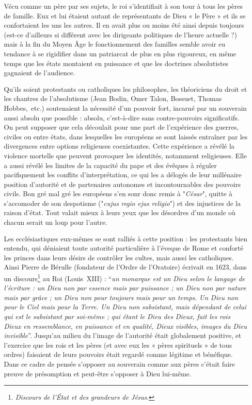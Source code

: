 Vécu comme un père par ses sujets, le roi s'identifiait à son tour à tous les pères de famille. Eux et lui étaient autant de représentants de Dieu « le Père » et ils se confortaient les uns les autres. Il en avait plus ou moins été ainsi depuis toujours (est-ce d'ailleurs si différent avec les dirigeants politiques de l'heure actuelle ?) mais à la fin du Moyen Âge le fonctionnement des familles semble avoir eu tendance à se rigidifier dans un patriarcat de plus en plus rigoureux, en même temps que les états montaient en puissance et que les doctrines absolutistes gagnaient de l'audience. 

Qu'ils soient protestants ou catholiques les philosophes, les théoriciens du droit et les chantres de l'absolutisme (Jean Bodin, Omer Talon, Bossuet, Thomas Hobbes,~etc.) soutenaient la nécessité d'un pouvoir fort, incarné par un souverain aussi absolu que possible : absolu, c'est-à-dire sans contre-pouvoirs significatifs. On peut supposer que cela découlait pour une part de l'expérience des guerres, civiles ou entre états, dans lesquelles les européens se sont laissés entraîner par les divergences entre options religieuses coexistantes. Cette expérience a révélé la violence mortelle que peuvent provoquer les identités, notamment religieuses. Elle a aussi révélé les limites de la capacité du pape et des évêques à réguler pacifiquement les conflits d'interprétation, ce qui les a délogés de leur millénaire position d'autorité et de partenaires autonomes et incontournables des pouvoirs civils. Bon gré mal gré les européens s'en sonr donc remis à "\emph{César}", quitte à s'accomoder de son despotisme ("\emph{cujus regio ejus religio}") et des injustices de la raison d'état. Tout valait mieux à leurs yeux que les désordres d'un monde où chacun serait un loup pour l'autre. 

Les ecclésiastiques eux-mêmes se sont ralliés à cette position : les protestants bien entendu, qui déniaient toute autorité particulière à l'éveque de Rome et conforté les princes dans leurs désirs de contrôler les cultes, mais aussi les catholiques. Ainsi Pierre de Bérulle (fondateur de l'Ordre de l'Oratoire) écrivait en 1623, dans un discours\footnote{\emph{Discours de l'État et des grandeurs de Jésus}.} au Roi (Louis~XIII)  :
    \enquote{\emph{un monarque est un Dieu selon le langage de l'écriture : un Dieu non par essence mais par puissance ; un Dieu non par nature mais par grâce ; un Dieu non pour toujours mais pour un temps. Un Dieu non pour le Ciel mais pour la Terre. Un Dieu non subsistant, mais dépendant de celui qui est le subsistant par soi-même ; qui étant le Dieu des Dieux, fait les rois Dieux en ressemblance, en puissance et en qualité, Dieux visibles, images du Dieu invisible}}. Jusqu'au milieu du  l'image de l'autorité était globalement positive, et l'exercice que les rois et les pères (et avec eux les « pères spirituels » de tous ordres) faisaient de leurs pouvoirs était regardé comme légitime et bénéfique. Dans ce cadre de pensée s'opposer au souverain comme aux pères c'était faire preuve de présomption et peut-être s'opposer à Dieu lui-même. 
    
